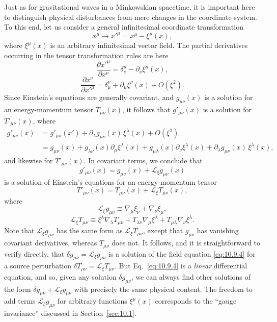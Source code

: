 Just as for gravitational waves in a Minkowskian spacetime, it is important
here to distinguish physical disturbances from mere changes in the coordinate
system. To this end, let us consider a general infinitesimal coordinate
transformation
\begin{equation}
  x^\mu\longrightarrow x'^\mu=x^\mu-\xi^\mu(x),
  \tag{10.9.6}\label{eq:10.9.6}
\end{equation}
where \(\xi^\mu(x)\) is an arbitrary infinitesimal vector field. The partial
derivatives occurring in the tensor transformation rules are here
\[
  \frac{\partial x'^\mu}{\partial x^\nu}
  =
  \delta^\mu_\nu-\partial_\nu\xi^\mu(x),
\]
\[
  \frac{\partial x^\nu}{\partial x'^\mu}
  =
  \delta^\nu_\mu+\partial_\mu\xi^\nu(x)+O(\xi^2).
\]
Since Einstein's equations are generally covariant, and \(g_{\mu\nu}(x)\)
is a solution for an energy-momentum tensor \(T_{\mu\nu}(x)\), it follows
that \(g'_{\mu\nu}(x)\) is a solution for \(T'_{\mu\nu}(x)\), where
\[
  \begin{split}
  g'_{\mu\nu}(x)
  &=
  g'_{\mu\nu}(x')
  +\partial_\lambda g_{\mu\nu}(x)\,\xi^\lambda(x)
  +O(\xi^2)
  \\
  &=
  g_{\mu\nu}(x)
  +g_{\lambda\nu}(x)\partial_\mu\xi^\lambda(x)
  +g_{\mu\lambda}(x)\partial_\nu\xi^\lambda(x)
  +\partial_\lambda g_{\mu\nu}(x)\,\xi^\lambda(x),
  \end{split}
\]
and likewise for \(T'_{\mu\nu}(x)\). In covariant terms, we conclude that
\begin{equation}
  g'_{\mu\nu}(x)
  =
  g_{\mu\nu}(x)+\mathcal L_\xi g_{\mu\nu}(x)
  \tag{10.9.7}\label{eq:10.9.7}
\end{equation}
is a solution of Einstein's equations for an energy-momentum tensor
\begin{equation}
  T'_{\mu\nu}(x)
  =
  T_{\mu\nu}(x)+\mathcal L_\xi T_{\mu\nu}(x),
  \tag{10.9.8}\label{eq:10.9.8}
\end{equation}
where
\begin{equation}
  \mathcal L_\xi g_{\mu\nu}
  \equiv
  \nabla_\mu\xi_\nu+\nabla_\nu\xi_\mu,
  \tag{10.9.9}\label{eq:10.9.9}
\end{equation}
\begin{equation}
  \mathcal L_\xi T_{\mu\nu}
  \equiv
  \xi^\lambda\nabla_\lambda T_{\mu\nu}
  +T_{\lambda\nu}\nabla_\mu\xi^\lambda
  +T_{\mu\lambda}\nabla_\nu\xi^\lambda.
  \tag{10.9.10}\label{eq:10.9.10}
\end{equation}
Note that \(\mathcal L_\xi g_{\mu\nu}\) has the same form as
\(\mathcal L_\xi T_{\mu\nu}\), except that \(g_{\mu\nu}\) has vanishing
covariant derivatives, whereas \(T_{\mu\nu}\) does not. It follows, and it is
straightforward to verify directly, that
\(\delta g_{\mu\nu}=\mathcal L_\xi g_{\mu\nu}\) is a solution of the field
equation \eqref{eq:10.9.4} for a source perturbation
\(\delta T_{\mu\nu}=\mathcal L_\xi T_{\mu\nu}\). But
Eq.~\eqref{eq:10.9.4} is a \emph{linear} differential equation, and so,
given any solution \(\delta g_{\mu\nu}\), we can always find other solutions
of the form
\(\delta g_{\mu\nu}+\mathcal L_\xi g_{\mu\nu}\) with precisely the same
physical content. The freedom to add terms
\(\mathcal L_\xi g_{\mu\nu}\) for arbitrary functions \(\xi^\mu(x)\)
corresponds to the ``gauge invariance'' discussed in
Section~\ref{sec:10.1}.

